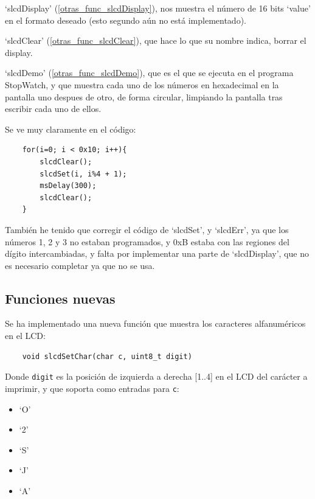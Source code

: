 \documentclass[a4paper,openright,12pt]{article}
\begin{document}
`slcdDisplay' (\ref{otras_func_slcdDisplay}), nos muestra el número de 16 bits `value' en el formato deseado (esto segundo aún no está implementado).

`slcdClear' (\ref{otras_func_slcdClear}), que hace lo que su nombre indica, borrar el display.

`slcdDemo' (\ref{otras_func_slcdDemo}), que es el que se ejecuta en el programa StopWatch, y que muestra cada uno de los números en hexadecimal en la pantalla uno
despues de otro, de forma circular, limpiando la pantalla tras escribir cada uno de ellos.

Se ve muy claramente en el código:
\begin{samepage}
\begin{verbatim}
    for(i=0; i < 0x10; i++){
        slcdClear();
        slcdSet(i, i%4 + 1);
        msDelay(300);
        slcdClear();
    }   
\end{verbatim}
\end{samepage}

También he tenido que corregir el código de `slcdSet', y `slcdErr', ya que los números 1, 2 y 3 no estaban programados,
y 0xB estaba con las regiones del dígito intercambiadas, y falta por implementar una parte de `slcdDisplay', que no es necesario completar ya que no se usa.

\subsection{Funciones nuevas}
Se ha implementado una nueva función que muestra los caracteres alfanuméricos en el LCD:
\begin{verbatim}
    void slcdSetChar(char c, uint8_t digit)
\end{verbatim}

Donde \texttt{digit} es la posición de izquierda a derecha [1..4] en el LCD del carácter a imprimir, y que soporta como entradas para \texttt{c}:
\begin{itemize}
    \item `O'
    \item `2'
    \item `S'
    \item `J'
    \item `A'
\end{itemize}


\clearpage
\begin{flushleft}
\printbibliography[]{}
\end{flushleft}
\end{document}
